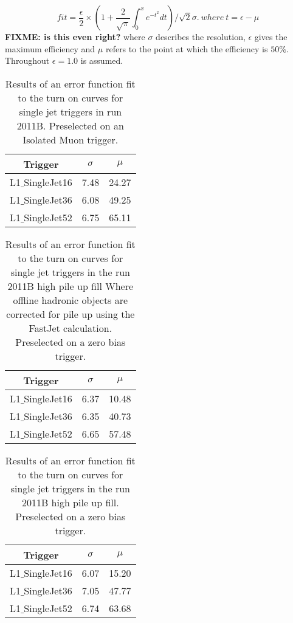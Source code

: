 \begin{equation}
    fit = \frac{\epsilon}{2} \times (1 + 
    \frac{2}{\sqrt{\pi}}\int^{x}_{0}e^{-t^{2}}dt)/\sqrt{2}\sigma. ~ where~ t = 
    \epsilon - \mu
\label{eqn:erf}
\end{equation}
\textbf{FIXME: is this even right?}
where $\sigma$ describes the resolution, $\epsilon$ gives the maximum 
efficiency and $\mu$ refers to the point at which the efficiency is $50\%$.
Throughout $\epsilon = 1.0 $ is assumed. 
\begin{table}[ht]
\begin{tabular}{|c|c|c|}
\hline
Trigger & $\sigma$ & $\mu$\\
\hline
L1$\_$SingleJet16 & 7.48 & 24.27 \\
\hline
L1$\_$SingleJet36 & 6.08 & 49.25 \\
\hline
L1$\_$SingleJet52 & 6.75 & 65.11 \\
\hline
\end{tabular}
\caption{Results of an error function fit to the turn on curves for \Lone 
single jet triggers in run 2011B. Preselected on an Isolated Muon trigger.}
\label{tab:2011B_performance}
\end{table}


\begin{table}[ht]
\begin{tabular}{|c|c|c|}
\hline
Trigger & $\sigma$ & $\mu$\\
\hline
L1$\_$SingleJet16 & 6.37 & 10.48 \\
\hline
L1$\_$SingleJet36 & 6.35 & 40.73 \\
\hline
L1$\_$SingleJet52 & 6.65 & 57.48 \\
\hline
\end{tabular}
\caption{Results of an error function fit to the turn on curves for \Lone 
single jet triggers in the run 2011B high pile up fill Where offline hadronic 
objects are corrected for pile up using the FastJet calculation. Preselected on 
a zero bias trigger.}
\label{tab:2011B_HighPU_FastJet}
\end{table}


\begin{table}[ht]
\begin{tabular}{|c|c|c|}
\hline
Trigger & $\sigma$ & $\mu$\\
\hline
L1$\_$SingleJet16 & 6.07 & 15.20 \\
\hline
L1$\_$SingleJet36 & 7.05 & 47.77 \\
\hline
L1$\_$SingleJet52 & 6.74 & 63.68 \\
\hline
\end{tabular}
\caption{Results of an error function fit to the turn on curves for \Lone 
single jet triggers in the run 2011B high pile up fill. Preselected on a zero
bias trigger.}
\label{tab:2011B_HighPU_NoFastJet}
\end{table}


